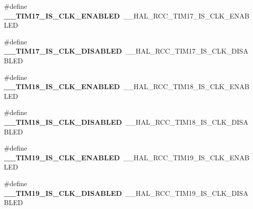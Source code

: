 \begin{DoxyCompactItemize}
\item 
\#define {\bfseries \+\_\+\+\_\+\+T\+I\+M17\+\_\+\+I\+S\+\_\+\+C\+L\+K\+\_\+\+E\+N\+A\+B\+L\+ED}~\+\_\+\+\_\+\+H\+A\+L\+\_\+\+R\+C\+C\+\_\+\+T\+I\+M17\+\_\+\+I\+S\+\_\+\+C\+L\+K\+\_\+\+E\+N\+A\+B\+L\+ED\hypertarget{group___h_a_l___r_c_c___aliased_ga7607b2ea34cb142f526c9e771a854777}{}\label{group___h_a_l___r_c_c___aliased_ga7607b2ea34cb142f526c9e771a854777}

\item 
\#define {\bfseries \+\_\+\+\_\+\+T\+I\+M17\+\_\+\+I\+S\+\_\+\+C\+L\+K\+\_\+\+D\+I\+S\+A\+B\+L\+ED}~\+\_\+\+\_\+\+H\+A\+L\+\_\+\+R\+C\+C\+\_\+\+T\+I\+M17\+\_\+\+I\+S\+\_\+\+C\+L\+K\+\_\+\+D\+I\+S\+A\+B\+L\+ED\hypertarget{group___h_a_l___r_c_c___aliased_gab464919b131d5b3cb1799e5c306e8cb0}{}\label{group___h_a_l___r_c_c___aliased_gab464919b131d5b3cb1799e5c306e8cb0}

\item 
\#define {\bfseries \+\_\+\+\_\+\+T\+I\+M18\+\_\+\+I\+S\+\_\+\+C\+L\+K\+\_\+\+E\+N\+A\+B\+L\+ED}~\+\_\+\+\_\+\+H\+A\+L\+\_\+\+R\+C\+C\+\_\+\+T\+I\+M18\+\_\+\+I\+S\+\_\+\+C\+L\+K\+\_\+\+E\+N\+A\+B\+L\+ED\hypertarget{group___h_a_l___r_c_c___aliased_ga689f73387fa43ec3bd6e2ffc45d6c720}{}\label{group___h_a_l___r_c_c___aliased_ga689f73387fa43ec3bd6e2ffc45d6c720}

\item 
\#define {\bfseries \+\_\+\+\_\+\+T\+I\+M18\+\_\+\+I\+S\+\_\+\+C\+L\+K\+\_\+\+D\+I\+S\+A\+B\+L\+ED}~\+\_\+\+\_\+\+H\+A\+L\+\_\+\+R\+C\+C\+\_\+\+T\+I\+M18\+\_\+\+I\+S\+\_\+\+C\+L\+K\+\_\+\+D\+I\+S\+A\+B\+L\+ED\hypertarget{group___h_a_l___r_c_c___aliased_ga4d9c249dc0f822a21b7ebe77f6f9c091}{}\label{group___h_a_l___r_c_c___aliased_ga4d9c249dc0f822a21b7ebe77f6f9c091}

\item 
\#define {\bfseries \+\_\+\+\_\+\+T\+I\+M19\+\_\+\+I\+S\+\_\+\+C\+L\+K\+\_\+\+E\+N\+A\+B\+L\+ED}~\+\_\+\+\_\+\+H\+A\+L\+\_\+\+R\+C\+C\+\_\+\+T\+I\+M19\+\_\+\+I\+S\+\_\+\+C\+L\+K\+\_\+\+E\+N\+A\+B\+L\+ED\hypertarget{group___h_a_l___r_c_c___aliased_ga71f720ee852e32bd677cb76758e1a2d6}{}\label{group___h_a_l___r_c_c___aliased_ga71f720ee852e32bd677cb76758e1a2d6}

\item 
\#define {\bfseries \+\_\+\+\_\+\+T\+I\+M19\+\_\+\+I\+S\+\_\+\+C\+L\+K\+\_\+\+D\+I\+S\+A\+B\+L\+ED}~\+\_\+\+\_\+\+H\+A\+L\+\_\+\+R\+C\+C\+\_\+\+T\+I\+M19\+\_\+\+I\+S\+\_\+\+C\+L\+K\+\_\+\+D\+I\+S\+A\+B\+L\+ED\hypertarget{group___h_a_l___r_c_c___aliased_ga612107385d789986a2200f18f05bfc9f}{}\label{group___h_a_l___r_c_c___aliased_ga612107385d789986a2200f18f05bfc9f}


\end{DoxyCompactItemize}
